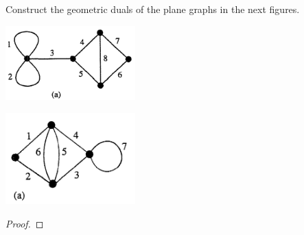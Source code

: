 \prob
{
    Construct the geometric duals of the plane graphs in the next figures.
		        \begin{center}
                \includegraphics[width=5cm]{Test2/Problem10/Figure1_4.png}
            \end{center}\pn
						
						\begin{center}
                \includegraphics[width=5cm]{Test2/Problem10/Figure1_28.png}
            \end{center}\pn
}
\begin{proof}
\end{proof}